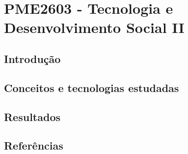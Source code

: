 \chapter{PME2603 - Tecnologia e Desenvolvimento Social II}
\section{Introdução}
\section{Conceitos e tecnologias estudadas}
\section{Resultados}
\section{Referências}
